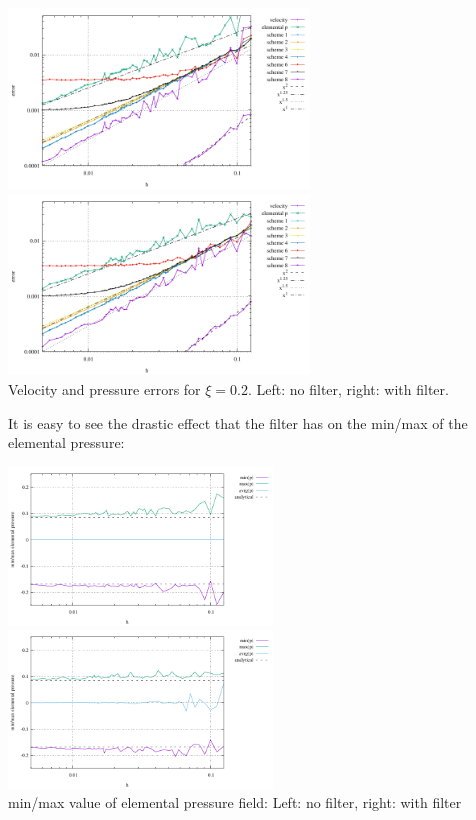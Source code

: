 \begin{center}
\includegraphics[width=8cm]{python_codes/fieldstone_12/results/rand/errors_nofilter}
\includegraphics[width=8cm]{python_codes/fieldstone_12/results/rand/errors_filter}\\
{\captionfont Velocity and pressure errors for $\xi=0.2$. Left: no filter, right: with filter.} 
\end{center}

It is easy to see the drastic effect that the filter has on the min/max of the elemental pressure:
\begin{center}
\includegraphics[width=7cm]{python_codes/fieldstone_12/results/rand/rawp_nofilter}
\includegraphics[width=7cm]{python_codes/fieldstone_12/results/rand/rawp_filter}\\
{\captionfont min/max value of elemental pressure field: Left: no filter, right: with filter}
\end{center}

